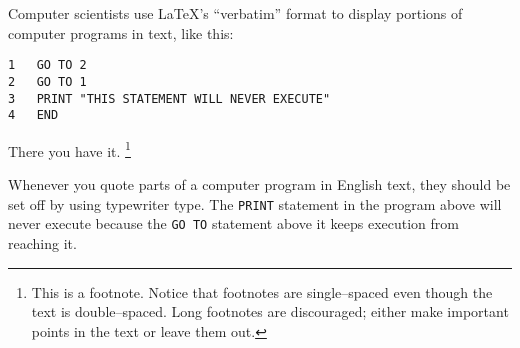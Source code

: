 \documentclass[12pt]{report}
\begin{document}
Computer scientists use LaTeX's ``verbatim'' format to display portions
of computer programs in text, like this:
\begin{singlespace}\begin{verbatim}
1   GO TO 2
2   GO TO 1
3   PRINT "THIS STATEMENT WILL NEVER EXECUTE"
4   END
\end{verbatim}\end{singlespace}
There you have it.%
\footnote{This is a footnote. Notice that footnotes are single--spaced
even though the text is double--spaced. Long footnotes are discouraged;
either make important points in the text or leave them out.}

Whenever you quote parts of a computer program in English text, they
should be set off by using typewriter type.  The \verb"PRINT" statement
in the program above will never execute because the \verb"GO TO"
statement above it keeps execution from reaching it.
\end{document}
